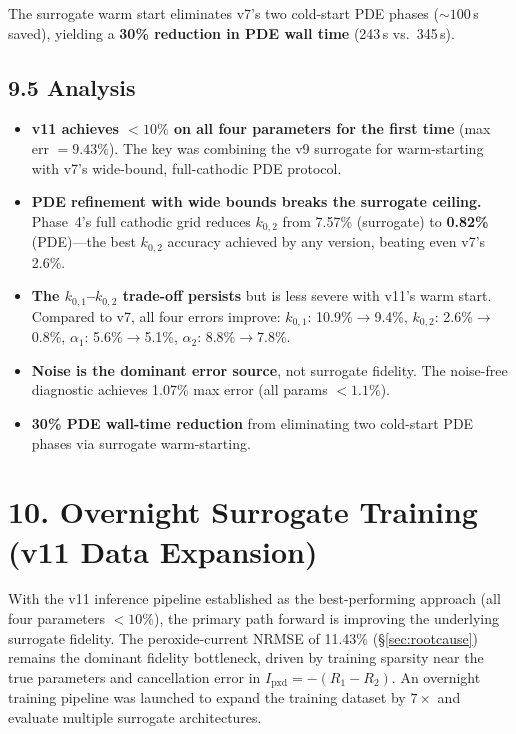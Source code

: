 \documentclass[11pt]{article}
\begin{document}
The surrogate warm start eliminates v7's two cold-start PDE phases
(${\sim}100$\,s saved), yielding a \textbf{30\% reduction in PDE wall time}
(243\,s vs.\ 345\,s).

\subsection*{9.5 Analysis}

\begin{itemize}
  \item \textbf{v11 achieves $<10\%$ on all four parameters for the first time}
        (max err $= 9.43\%$).  The key was combining the v9 surrogate for
        warm-starting with v7's wide-bound, full-cathodic PDE protocol.

  \item \textbf{PDE refinement with wide bounds breaks the surrogate ceiling.}
        Phase~4's full cathodic grid reduces $k_{0,2}$ from 7.57\% (surrogate)
        to \textbf{0.82\%} (PDE)---the best $k_{0,2}$ accuracy achieved by any
        version, beating even v7's 2.6\%.

  \item \textbf{The $k_{0,1}$--$k_{0,2}$ trade-off persists} but is less severe
        with v11's warm start.  Compared to v7, all four errors improve:
        $k_{0,1}$: 10.9\%$\to$9.4\%,
        $k_{0,2}$: 2.6\%$\to$0.8\%,
        $\alpha_1$: 5.6\%$\to$5.1\%,
        $\alpha_2$: 8.8\%$\to$7.8\%.

  \item \textbf{Noise is the dominant error source}, not surrogate fidelity.
        The noise-free diagnostic achieves 1.07\% max error (all params $<1.1\%$).

  \item \textbf{30\% PDE wall-time reduction} from eliminating two cold-start
        PDE phases via surrogate warm-starting.
\end{itemize}


\section*{10. Overnight Surrogate Training (v11 Data Expansion)}\label{sec:overnight}

With the v11 inference pipeline established as the best-performing approach
(all four parameters $< 10\%$), the primary path forward is improving the
underlying surrogate fidelity.  The peroxide-current NRMSE of 11.43\%
(\S\ref{sec:rootcause}) remains the dominant fidelity bottleneck, driven by
training sparsity near the true parameters and cancellation error in
$I_{\text{pxd}} = -(R_1 - R_2)$.  An overnight training pipeline was
launched to expand the training dataset by $7\times$ and evaluate multiple
surrogate architectures.
\end{document}
